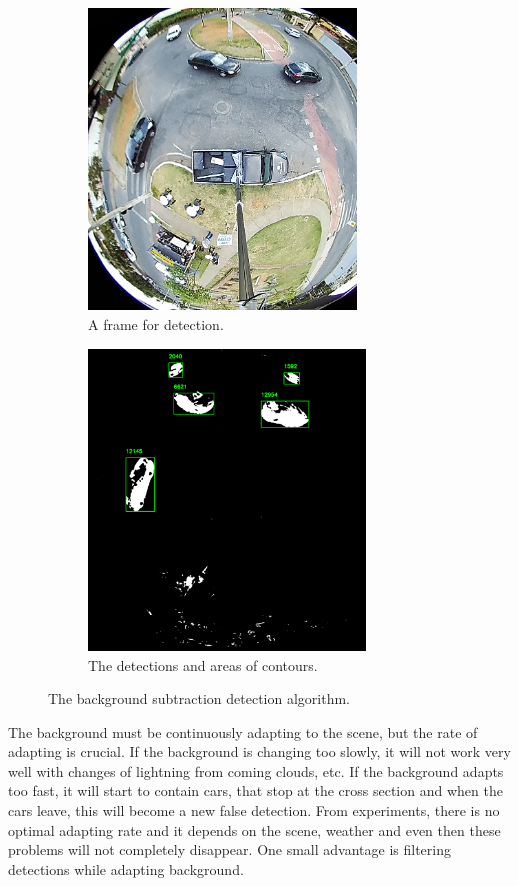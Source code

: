 \documentclass[a4paper,12pt,titlepage, twoside]{article}
\numberwithin{figure}{section}
\begin{document}
\begin{figure}
    \begin{subfigure}[Sample1]{0.5\linewidth}
    	\includegraphics[height=80mm]{fig/frame_cropped.png} 
        \caption{A frame for detection.}
        \label{fig:frame_for_detection}   
    \end{subfigure}
    \qquad
    \begin{subfigure}[Sample1]{0.5\linewidth} 
    	\includegraphics[height=80mm]{fig/mask_area.png}
        \caption{The detections and areas of contours.}   
        \label{fig:mask_area}
    \end{subfigure} 
    \caption{The background subtraction detection algorithm.}
\end{figure}

The background must be continuously adapting to the scene, but the rate of adapting is crucial. If the background is changing too slowly, it will not work very well with changes of lightning from coming clouds, etc. If the background adapts too fast, it will start to contain cars, that stop at the cross section and when the cars leave, this will become a new false detection. From experiments, there is no optimal adapting rate and it depends on the scene, weather and even then these problems will not completely disappear. One small advantage is filtering detections while adapting background.
\end{document}
